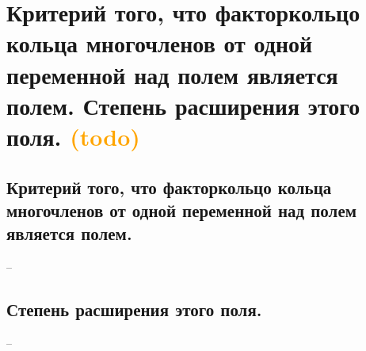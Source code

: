 \section{Критерий того, что факторкольцо кольца многочленов от одной переменной над полем является полем. Степень расширения этого поля. \textcolor{orange}{(todo)}}

\subsection{Критерий того, что факторкольцо кольца многочленов от одной переменной над полем является полем.}
--

\subsection{Степень расширения этого поля.}
--
